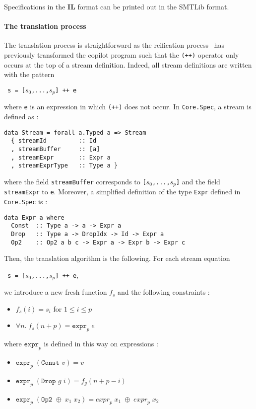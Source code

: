 \medskip

Specifications in the \textbf{IL} format can be printed out in the SMTLib format.

\paragraph{The translation process} 

The translation process is straightforward as the reification process~\cite{} has previously transformed the copilot program such that the \texttt{(++)} operator only occurs at the top of a stream definition. Indeed, all stream definitions are written with the pattern
\begin{center}\texttt{ s = [$s_0$,...,$s_p$] ++ e}\end{center}
where \texttt{e} is an expression in which \texttt{(++)} does not occur. In \texttt{Core.Spec}, a stream is defined as :
\begin{lstlisting}[frame=single]
data Stream = forall a.Typed a => Stream
  { streamId         :: Id
  , streamBuffer     :: [a]
  , streamExpr       :: Expr a
  , streamExprType   :: Type a }
\end{lstlisting}
where the field \texttt{streamBuffer} corresponds to \texttt{[$s_0$,...,$s_p$]} and the field \texttt{streamExpr} to \texttt{e}. Moreover, a simplified definition of the type \texttt{Expr} defined in \texttt{Core.Spec} is :
\begin{lstlisting}[frame=single]
data Expr a where
  Const  :: Type a -> a -> Expr a
  Drop   :: Type a -> DropIdx -> Id -> Expr a
  Op2    :: Op2 a b c -> Expr a -> Expr b -> Expr c
\end{lstlisting}
Then, the translation algorithm is the following. For each stream equation \begin{center}\texttt{ s = [$s_0$,...,$s_p$] ++ e},\end{center}we introduce a new fresh function $f_s$ and the following constraints :

\begin{itemize}
\item $f_s(i) = s_i$ \quad for $1 \leq i \leq p$
\item $\forall n . \; f_s(n + p) = \texttt{expr}_p \; e$
\end{itemize}
where $\texttt{expr}_p$ is defined in this way on expressions :
\begin{itemize}
\item $\texttt{expr}_p \; (\texttt{Const } v) = v$
\item $\texttt{expr}_p \; (\texttt{Drop } g \; i) = f_g(n + p - i)$
\item $\texttt{expr}_p \; (\texttt{Op2 } \oplus \; x_1 \; x_2) =  {expr}_p \; x_1 \; \oplus \; {expr}_p \; x_2 $
\end{itemize}


